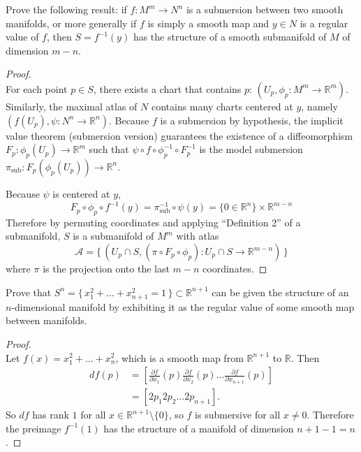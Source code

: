 \documentclass{article}
\newenvironment{problem}[2][Problem]{\begin{trivlist}
\item[\hskip \labelsep {\bfseries #1}\hskip \labelsep {\bfseries #2.}]}{\end{trivlist}}
\begin{document}
\begin{problem}{4}
  Prove the following result: if $f\colon M^m \rightarrow N^n$ is a submersion
  between two smooth manifolds, or more generally if $f$ is simply a smooth map
  and $y \in N$ is a regular value of $f$, then $S = f^{-1}(y)$ has the
  structure of a smooth submanifold of $M$ of dimension $m - n$.
\end{problem}

\begin{proof} \text{}\\
  For each point $p \in S$, there exists a chart that contains $p$:
    $(U_p, \phi_p: M^m \rightarrow \mathbb{R}^m)$.
  Similarly, the maximal atlas of $N$ contains many charts centered at $y$, namely
    $(f(U_p), \psi: N^n \rightarrow \mathbb{R}^n)$.
  Because $f$ is a submersion by hypothesis, the implicit value theorem
  (submersion version) guarantees the existence of a diffeomorphism
  $F_p: \phi_p(U_p) \rightarrow \mathbb{R}^m$ such that
  $\psi \circ f \circ \phi_p^{-1} \circ F_p^{-1}$ is the model submersion
  $\pi_\text{sub}: F_p(\phi_p(U_p)) \rightarrow \mathbb{R}^n$.

  Because $\psi$ is centered at $y$, \[
    F_p\circ\phi_p\circ f^{-1}(y) = \pi_\text{sub}^{-1} \circ \psi(y)
      = \{ 0 \in \mathbb{R}^n\} \times \mathbb{R}^{m - n}
  \]
  Therefore by permuting coordinates and applying ``Definition 2'' of a submanifold,
  $S$ is a submanifold of $M^m$ with atlas \[
    \mathcal{A} = \{\, (
      U_p \cap S,
      (\pi \circ F_p \circ \phi_p)\colon U_p \cap S \rightarrow \mathbb{R}^{m-n}
    ) \,\}
  \] where $\pi$ is the projection onto the last $m - n$ coordinates.
\end{proof}

\pagebreak

\begin{problem}{5}
  Prove that $S^n = \{\,x_1^2+\hdots+x_{n+1}^2=1\,\} \subset \mathbb{R}^{n+1}$
  can be given the structure of an $n$-dimensional manifold by exhibiting it as
  the regular value of some smooth map between manifolds.
\end{problem}

\begin{proof} \text{} \\
  Let $f(x) = x_1^2+\hdots+x_n^2$, which is a smooth map from $\mathbb{R}^{n+1}$
  to $\mathbb{R}$.
  Then \begin{align*}
    df(p) &= \left[
      \frac{\partial f}{\partial x_1}(p) \frac{\partial f}{\partial x_2}(p) \hdots
      \frac{\partial f}{\partial x_{n+1}}(p)
    \right] \\
    &= [2p_1 2p_2 \hdots 2p_{n+1}].
  \end{align*}
  So $df$ has rank $1$ for all $x \in \mathbb{R}^{n + 1} \setminus \{0\}$, so
  $f$ is submersive for all $x \not= 0$. Therefore the preimage $f^{-1}(1)$ has
  the structure of a manifold of dimension $n + 1 - 1 = n$.
\end{proof}
\end{document}
